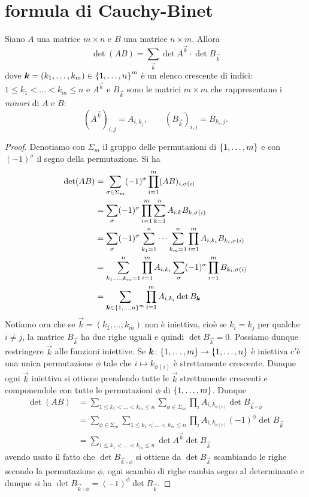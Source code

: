 
\section{formula di Cauchy-Binet}
\begin{theorem}
  Siano $A$ una matrice $m\times n$ e $B$ una matrice $n\times m$.
  Allora 
  \[
    \det (AB) = \sum_{\vec k} \det A^{\vec k}\cdot \det B_{\vec k}
  \]
  dove 
  $\boldsymbol k = (k_1,\dots,k_m) \in {\left\{ 1,\dots,n \right\}}^m$ 
  è un elenco crescente di indici: $1\le k_1 < \dots < k_m\le n$
  e $A^{\vec k}$ e $B_{\vec k}$ sono le matrici $m\times m$ che 
  rappresentano i \emph{minori} di $A$ e $B$:
  \[
    (A^{\vec k})_{i,j} = A_{i,k_j}, \qquad
    (B_{\vec k})_{i,j} = B_{k_i, j}.
  \]
\end{theorem}
%
\begin{proof}
Denotiamo con $\Sigma_m$ il gruppo delle permutazioni 
di ${\left\{ 1,\dots,m \right\}}$ 
e con $(-1)^\sigma$ il segno della permutazione.
Si ha
\begin{align*}
  \det (AB) &= \sum_{\sigma \in \Sigma_m} (-1)^\sigma \prod_{i=1}^m (AB)_{i,\sigma(i)} \\
    &= \sum_\sigma (-1)^\sigma \prod_{i=1}^m \sum_{k=1}^n A_{i,k} B_{k,\sigma(i)} \\
    &= \sum_\sigma (-1)^\sigma \sum_{k_1=1}^n \dots \sum_{k_m=1}^n \prod_{i=1}^m A_{i,k_i} B_{k_i,\sigma(i)} \\
    &= \sum_{k_1,\dots,k_m=1}^n \prod_{i=1}^m A_{i,k_i} \sum_\sigma (-1)^\sigma \prod_{i=1}^m B_{k_i,\sigma(i)} \\
    &= \sum_{\boldsymbol k\in {\left\{ 1,\dots,n \right\}}^m} \prod_{i=1}^m A_{i,k_i} \det B_{\boldsymbol k}
\end{align*}
Notiamo ora che se $\vec k = (k_1,\dots,k_m)$ non è iniettiva, cioè se $k_i = k_j$ per qualche 
$i\neq j$, la matrice $B_{\vec k}$ ha due righe uguali e quindi $\det B_{\vec k}=0$. 
Possiamo dunque restringere $\vec k$ alle funzioni iniettive.
Se $\boldsymbol k\colon{\left\{ 1,\dots,m \right\}}\to{\left\{ 1,\dots,n \right\}}$ è iniettiva c'è una 
unica permutazione $\phi$ tale che $i\mapsto k_{\phi(i)}$ è strettamente crescente.
Dunque ogni $\vec k$ iniettiva si ottiene prendendo tutte le $\vec k$ strettamente crescenti 
e componendole con tutte le permutazioni $\phi$ di ${\left\{ 1,\dots,m \right\}}$. 
Dunque
\begin{align*}
  \det(AB) 
    &= \sum_{1\le k_1<\dots<k_m\le n}\sum_{\phi\in \Sigma_m}
    \prod_i A_{i,k_{\phi(i)}} \det B_{\vec k\circ \phi}\\
    &= \sum_{\phi\in \Sigma_m} \sum_{1\le k_1<\dots<k_m\le n}
    \prod_i A_{i,k_{\phi(i)}} (-1)^\phi \det B_{\vec k}\\
    &= \sum_{1\le k_1<\dots<k_m\le n} 
    \det A^{\vec k} \det B_{\vec k}
\end{align*}
avendo usato il fatto che $\det B_{\vec k\circ \phi}$
si ottiene da $\det B_{\vec k}$ scambiando le righe 
secondo la permutazione $\phi$, ogni scambio di righe 
cambia segno al determinante e dunque si ha $\det B_{\vec k\circ \phi} = (-1)^\phi \det B_{\vec k}$.
\end{proof}


